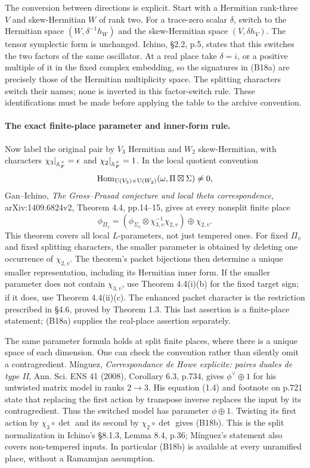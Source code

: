 \documentclass[11pt]{article}
\theoremstyle{definition}\newtheorem{definition}[theorem]{Definition}\newtheorem{remark}[theorem]{Remark}
\begin{document}
The conversion between directions is explicit. Start with a
Hermitian rank-three $V$ and skew-Hermitian $W$ of rank two.
For a trace-zero scalar $\delta$, switch to the Hermitian space
$(W,\delta^{-1}h_W)$ and the skew-Hermitian space
$(V,\delta h_V)$. The tensor symplectic form is unchanged.
Ichino, \S2.2, p.5, states that this switches the two factors of
the same oscillator. At a real place take $\delta=i$, or a
positive multiple of it in the fixed complex embedding, so the
signatures in (B18a) are precisely those of the Hermitian
multiplicity space. The splitting characters switch their names;
none is inverted in this factor-switch rule. These identifications
must be made before applying the table to the archive convention.

\paragraph{The exact finite-place parameter and inner-form rule.}
Now label the original pair by $V_3$ Hermitian and $W_2$
skew-Hermitian, with characters $\chi_3|_{\mathbb A_F^\times}=\epsilon$
and $\chi_2|_{\mathbb A_F^\times}=1$. In the local quotient convention
\[
 \operatorname{Hom}_{\operatorname{U}(V_3)\times\operatorname{U}(W_2)}
       (\omega,\Pi\boxtimes\Sigma)\ne0,
\]
Gan--Ichino, \emph{The Gross--Prasad conjecture and local theta
correspondence}, arXiv:1409.6824v2, Theorem 4.4, pp.14--15,
gives at every nonsplit finite place
\[
 \phi_{\Pi_v}
    =(\phi_{\Sigma_v}\otimes\chi_{3,v}^{-1}\chi_{2,v})
                                      \oplus\chi_{2,v}.
 \tag{B18b}
\]
This theorem covers all local $L$-parameters, not just tempered
ones. For fixed $\Pi_v$ and fixed splitting characters, the
smaller parameter is obtained by deleting one occurrence of
$\chi_{2,v}$. The theorem's packet bijections then determine a
unique smaller representation, including its Hermitian inner
form. If the smaller parameter does not contain $\chi_{3,v}$,
use Theorem 4.4(i)(b) for the fixed target sign; if it does,
use Theorem 4.4(ii)(c). The enhanced packet character is the
restriction prescribed in \S4.6, proved by Theorem 1.3. This
last assertion is a finite-place statement; (B18a) supplies the
real-place assertion separately.

The same parameter formula holds at split finite places, where
there is a unique space of each dimension. One can check the
convention rather than silently omit a contragredient.
M\'inguez, \emph{Correspondance de Howe explicite: paires duales
de type II}, Ann. Sci. ENS 41 (2008), Corollary 6.3, p.734,
gives $\phi^\vee\oplus1$ for his untwisted matrix model in
ranks $2\to3$. His equation (1.4) and footnote on p.721 state
that replacing the first action by transpose inverse replaces
the input by its contragredient. Thus the switched model has
parameter $\phi\oplus1$. Twisting its first action by
$\chi_3\circ\det$ and its second by $\chi_2\circ\det$ gives
(B18b). This is the split normalization in Ichino's \S8.1.3,
Lemma 8.4, p.36; M\'inguez's statement also covers non-tempered
inputs. In particular (B18b) is available at every unramified
place, without a Ramanujan assumption.
\end{document}
